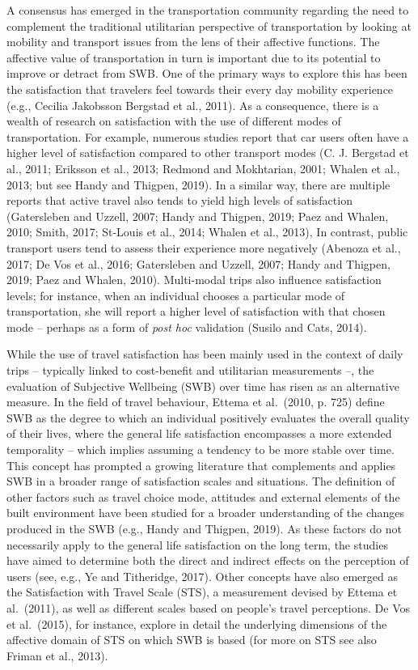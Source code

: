 \documentclass[]{elsarticle} %
\begin{document}
A consensus has emerged in the transportation community regarding the
need to complement the traditional utilitarian perspective of
transportation by looking at mobility and transport issues from the lens
of their affective functions. The affective value of transportation in
turn is important due to its potential to improve or detract from SWB.
One of the primary ways to explore this has been the satisfaction that
travelers feel towards their every day mobility experience (e.g.,
Cecilia Jakobsson Bergstad et al., 2011). As a consequence, there is a
wealth of research on satisfaction with the use of different modes of
transportation. For example, numerous studies report that car users
often have a higher level of satisfaction compared to other transport
modes (C. J. Bergstad et al., 2011; Eriksson et al., 2013; Redmond and
Mokhtarian, 2001; Whalen et al., 2013; but see Handy and Thigpen, 2019).
In a similar way, there are multiple reports that active travel also
tends to yield high levels of satisfaction (Gatersleben and Uzzell,
2007; Handy and Thigpen, 2019; Paez and Whalen, 2010; Smith, 2017;
St-Louis et al., 2014; Whalen et al., 2013), In contrast, public
transport users tend to assess their experience more negatively (Abenoza
et al., 2017; De Vos et al., 2016; Gatersleben and Uzzell, 2007; Handy
and Thigpen, 2019; Paez and Whalen, 2010). Multi-modal trips also
influence satisfaction levels; for instance, when an individual chooses
a particular mode of transportation, she will report a higher level of
satisfaction with that chosen mode -- perhaps as a form of \emph{post
hoc} validation (Susilo and Cats, 2014).

While the use of travel satisfaction has been mainly used in the context
of daily trips -- typically linked to cost-benefit and utilitarian
measurements --, the evaluation of Subjective Wellbeing (SWB) over time
has risen as an alternative measure. In the field of travel behaviour,
Ettema et al.~(2010, p. 725) define SWB as the degree to which an
individual positively evaluates the overall quality of their lives,
where the general life satisfaction encompasses a more extended
temporality -- which implies assuming a tendency to be more stable over
time. This concept has prompted a growing literature that complements
and applies SWB in a broader range of satisfaction scales and
situations. The definition of other factors such as travel choice mode,
attitudes and external elements of the built environment have been
studied for a broader understanding of the changes produced in the SWB
(e.g., Handy and Thigpen, 2019). As these factors do not necessarily
apply to the general life satisfaction on the long term, the studies
have aimed to determine both the direct and indirect effects on the
perception of users (see, e.g., Ye and Titheridge, 2017). Other concepts
have also emerged as the Satisfaction with Travel Scale (STS), a
measurement devised by Ettema et al.~(2011), as well as different scales
based on people's travel perceptions. De Vos et al.~(2015), for
instance, explore in detail the underlying dimensions of the affective
domain of STS on which SWB is based (for more on STS see also Friman et
al., 2013).
\end{document}
